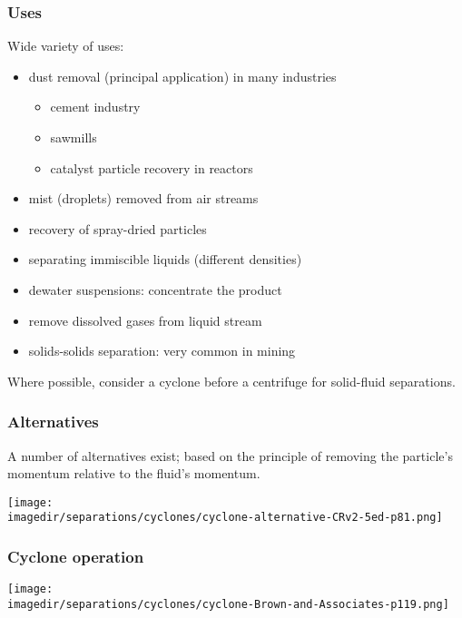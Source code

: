 \begin{frame}\frametitle{Uses}
	Wide variety of uses:
	\begin{itemize}
		\item	dust removal (principal application) in many industries
			\begin{itemize}
				\item	cement industry
				\item	sawmills
				\item	catalyst particle recovery in reactors
			\end{itemize}
		\item	mist (droplets) removed from air streams
		\item	recovery of spray-dried particles
		\item	separating immiscible liquids (different densities)
		\item	dewater suspensions: concentrate the product
		\item	remove dissolved gases from liquid stream
		\item	solids-solids separation: very common in mining
	\end{itemize}

	\vspace{12pt}
	\begin{exampleblock}{}
		Where possible, consider a cyclone before a centrifuge for solid-fluid separations.
	\end{exampleblock}
\end{frame}

\begin{frame}\frametitle{Alternatives}
	A number of alternatives exist; based on the principle of removing the particle's momentum relative to the fluid's momentum. {\color{myBlue}{Other options?}}

	\begin{center}
		\texttt{[image: \\imagedir/separations/cyclones/cyclone-alternative-CRv2-5ed-p81.png]}
	\end{center}
\end{frame}

\begin{frame}\frametitle{Cyclone operation}
	\begin{center}
		\texttt{[image: \\imagedir/separations/cyclones/cyclone-Brown-and-Associates-p119.png]}
	\end{center}
\end{frame}

